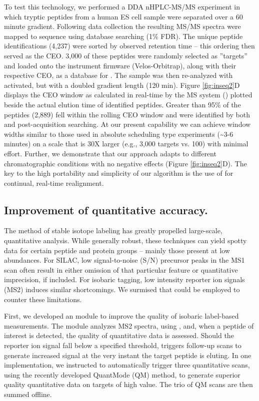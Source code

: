 To test this technology, we performed a DDA nHPLC-MS/MS experiment in which tryptic peptides from a human ES cell sample were separated over a 60 minute gradient. Following data collection the resulting MS/MS spectra were mapped to sequence using database searching (1\% FDR). The unique peptide identifications (4,237) were sorted by observed retention time -- this ordering then served as the CEO. 3,000 of these peptides were randomly selected as ''targets'' and loaded onto the instrument firmware (Velos-Orbitrap), along with their respective CEO, as a database for \inseq{}. The sample was then re-analyzed with \inseq{} activated, but with a doubled gradient length (120 min). Figure \ref{fig:inseq2}D displays the CEO window as calculated in real-time by the MS system (\inseq{}) plotted beside the actual elution time of identified peptides. Greater than 95\% of the peptides (2,889) fell within the rolling CEO window and were identified by both \inseq{} and post-acquisition searching. At our present capability we can achieve window widths similar to those used in absolute scheduling type experiments (\textasciitilde3-6 minutes) on a scale that is 30X larger (e.g., 3,000 targets vs. 100) with minimal effort.\cite{indexion,integrated} Further, we demonstrate that our approach adapts to different chromatographic conditions with no negative effects (Figure \ref{fig:inseq2}D). The key to the high portability and simplicity of our algorithm is the use of \inseq{} for continual, real-time realignment.

\subsection*{Improvement of quantitative accuracy.}

The method of stable isotope labeling has greatly propelled large-scale, quantitative analysis.\cite{pheromone,8plex,haploid,7tmr,esips,leeyeast} While generally robust, these techniques can yield spotty data for certain peptide and protein groups -- mainly those present at low abundances. For SILAC, low signal-to-noise (S/N) precursor peaks in the MS1 scan often result in either omission of that particular feature or quantitative imprecision, if included.\cite{dynamicrange} For isobaric tagging, low intensity reporter ion signals (MS2) induces similar shortcomings.\cite{itraqerror} We surmised that \inseq{} could be employed to counter these limitations.

First, we developed an \inseq{} module to improve the quality of isobaric label-based measurements. The module analyzes MS2 spectra, using \inseq{}, and, when a peptide of interest is detected, the quality of quantitative data is assessed. Should the reporter ion signal fall below a specified threshold, \inseq{} triggers follow-up scans to generate increased signal at the very instant the target peptide is eluting. In one implementation, we instructed \inseq{} to automatically trigger three quantitative scans, using the recently developed QuantMode (QM) method, to generate superior quality quantitative data on targets of high value.\cite{quantmode} The trio of QM scans are then summed offline.

